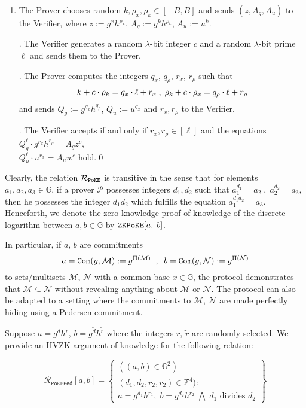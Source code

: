 \documentclass[11pt, lettersize, notitlepage, leqno, footskip=0.6cm]{article}
\newcommand{\ttt}{\texttt}
\newcommand{\bG}{\mathbb{G}}
\newcommand{\wti}{\widetilde}
\newcommand{\mc}{\mathcal}
\newcommand{\mb}{\mathbb}
\newcommand{\lam}{\lambda}
\newcommand{\sub}{\subseteq}
\newcommand{\mP}{\mc{P}}
\newcommand{\mcM}{\mc{M}}
\newcommand{\vs}{\vspace{-0.15cm}}
\newcommand{\noin}{\noindent}
\numberwithin{equation}{section}
\begin{document}
\begin{enumerate}[wide, labelwidth=!, labelindent=0pt]\vs \item The Prover chooses random $k, \rho_x, \rho_k\in [-B,B]$ and sends $(z, A_g, A_u)$ to the Verifier, where $z:= g^xh^{\rho_x}$, $A_g:= g^kh^{\rho_k}$, $A_u:= u^k$.

\noin 2. The Verifier generates a random $\lam$-bit integer $c$ and a random $\lam$-bit prime $\ell$ and sends them to the Prover.

\noin 3. The Prover computes the integers $q_x$, $q_{\rho}$, $r_x$, $r_{\rho}$ such that \vs $$k+c\cdot \rho_k = q_x\cdot \ell + r_x\;,\; \rho_k+c\cdot \rho_x = q_{\rho}\cdot \ell + r_{\rho} \vs $$ and sends $Q_g:= g^{q_x}h^{q_{\rho}}$, $Q_u:= u^{q_x}$ and $r_x,r_{\rho}$ to the Verifier.

\noin 4. The Verifier accepts if and only if $r_x,r_{\rho}\in [\ell]$ and the equations $Q_g^{\ell}\cdot g^{r_x}h^{r_{\rho}} = A_gz^c$,\\ $Q_u^{\ell}\cdot u^{r_x} = A_u w^{c}  $ hold.\qed \end{enumerate}

\noin Clearly, the relation $\mc{R}_{\tt{PoKE}}$ is transitive in the sense that for elements $a_1,a_2,a_3\in\mb{G}$, if a prover $\mP$ possesses integers $d_1,d_2$ such that $a_1^{d_1} = a_2\;,\;a_2^{d_2} = a_3$, then he possesses the integer $d_1d_2$ which fulfills the equation $a_1^{d_1d_2} = a_3$. Henceforth, we denote the zero-knowledge proof of knowledge of the discrete logarithm between $a,b\in\mb{G}$ by $\verb|ZKPoKE|[a,\;b]$.

In particular, if $a$, $b$ are commitments \vs $$ a = \ttt{Com}(g, \mc{M}) := g^{\Pi(\mcM)}\;\;,\;\;b = \ttt{Com}(g, \mc{N}) := g^{\Pi(\mc{N})}  \vs $$ to sets/multisets $\mcM$, $\mc{N}$ with  a common base $x\in\bG$, the protocol demonstrates that $\mcM\sub \mc{N}$ without revealing anything about $\mcM$ or $\mc{N}$. The protocol can also be adapted to a setting where the commitments to $\mc{M}$, $\mc{N}$ are made perfectly hiding using a Pedersen commitment.

Suppose $a = g^{d}h^{r}$, $b = g^{\wti{d}}h^{\wti{r}}$ where the integers $r$, $\wti{r}$ are randomly selected. We provide an HVZK argument of knowledge for  the following relation:\vs

\[
  \mc{R}_{\ttt{PoKEPed}}[a,b] = \left\{\begin{array}{l}
    ((a, b)\in\mb{G}^2)\\
    (d_1,d_2,r_2,r_2)\in\mb{Z}^4): \\
    a = g^{d_1}h^{r_1},\;b = g^{d_2}h^{r_2}\;\bigwedge\;d_1\text{ divides }d_2  \end{array}\right\}
\] 
\end{document}
